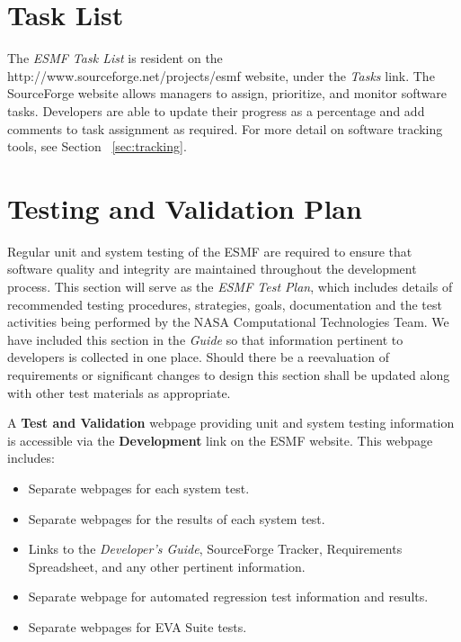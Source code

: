 
\section{Task List}
\label{sec:build}

The {\it ESMF Task List} is resident on the 
{http://www.sourceforge.net/projects/esmf} website, under the 
{\it Tasks} link. The SourceForge website allows managers to
assign, prioritize, and monitor software tasks. Developers are
able to update their progress as a percentage and add comments to
task assignment as required. For more detail on software
tracking tools, see Section ~\ref{sec:tracking}.

\section{Testing and Validation Plan}
\label{sec:testing}

Regular unit and system testing of the ESMF are required to ensure that 
software quality and integrity are maintained throughout 
the development process.  This section will serve as 
the {\it ESMF Test Plan}, which includes details 
of recommended testing procedures, strategies, goals, documentation 
and the test activities being performed by the NASA Computational 
Technologies Team.
We have included this section in the {\it Guide} 
so that information pertinent to developers is collected in one 
place.  Should there be a reevaluation of requirements or significant 
changes to design this section shall be updated along with other 
test materials as appropriate.

A {\bf Test and Validation} webpage providing unit and system testing 
information is accessible via the {\bf Development} link on the ESMF 
website. This webpage includes:
\begin{itemize}
\item Separate webpages for each system test.
\item Separate webpages for the results of each system test.
\item Links to the {\it Developer's Guide}, SourceForge Tracker, Requirements 
Spreadsheet, and any other pertinent information.
\item Separate webpage for automated regression test information and results.
\item Separate webpages for EVA Suite tests.
\end{itemize}

